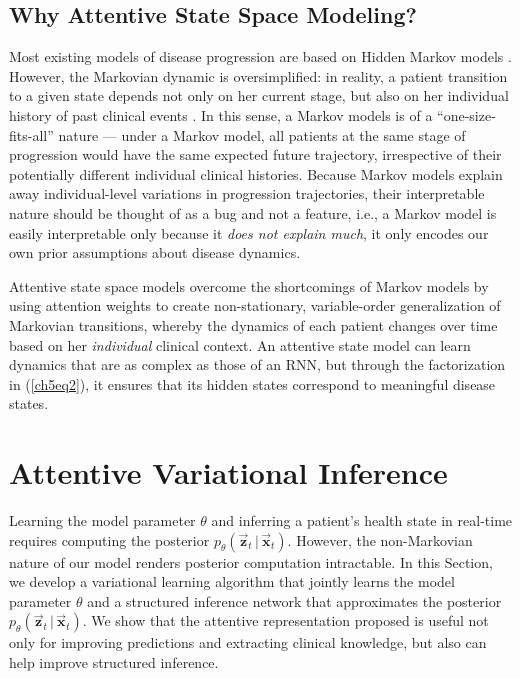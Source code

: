 \documentclass [PhD] {uclathes}
\begin{document}
\subsection{Why Attentive State Space Modeling?} %
\label{ch5sec24}
Most existing models of disease progression are based on Hidden Markov models \cite{alaa2017learning,liu2015efficient,wang2014unsupervised,green2002hidden}. However, the Markovian dynamic is oversimplified: in reality, a patient transition to a given state depends not only on her current stage, but also on her individual history of past clinical events \cite{sevick2007patients}. In this sense, a Markov models is of a ``one-size-fits-all'' nature --- under a Markov model, all patients at the same stage of progression would have the same expected future trajectory, irrespective of their potentially different individual clinical histories. Because Markov models explain away individual-level variations in progression trajectories, their interpretable nature should be thought of as a bug and not a feature, i.e., a Markov model is easily interpretable only because it {\it does not explain much}, it only encodes our own prior assumptions about disease dynamics. 

Attentive state space models overcome the shortcomings of Markov models by using attention weights to create non-stationary, variable-order generalization of Markovian transitions, whereby the dynamics of each patient changes over time based on her {\it individual} clinical context. An attentive state model can learn dynamics that are as complex as those of an RNN, but through the factorization in (\ref{ch5eq2}), it ensures that its hidden states correspond to meaningful disease states. 

\section{Attentive Variational Inference}
\label{ch5sec3}
Learning the model parameter $\theta$ and inferring a patient's health state in real-time requires computing the posterior $p_{\theta}(\boldsymbol{\vec{z}}_t\,|\,\boldsymbol{\vec{x}}_t)$. However, the non-Markovian nature of our model renders posterior computation intractable. In this Section, we develop a variational learning algorithm that jointly learns the model parameter $\theta$ and a structured inference network that approximates the posterior $p_{\theta}(\boldsymbol{\vec{z}}_t\,|\,\boldsymbol{\vec{x}}_t)$. We show that the attentive representation proposed is useful not only for improving predictions and extracting clinical knowledge, but also can help improve structured inference. 
\end{document}
